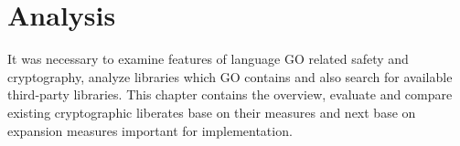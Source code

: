 \documentclass[
  digital, %
  notable,   %
  lof,     %
  lot,     %
]{fithesis3}
\begin{document}

\chapter{Analysis}
It was necessary to examine features of language GO related safety and cryptography, analyze 
libraries which GO contains and also search for available third-party libraries. This chapter 
contains the overview, evaluate and compare existing cryptographic liberates base on their 
measures and next base on expansion measures important for implementation.
\end{document}
